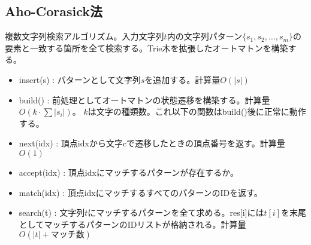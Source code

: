 \subsection{Aho-Corasick法}

複数文字列検索アルゴリズム。入力文字列$t$内の文字列パターン$\{s_1, s_2, \ldots, s_m \}$の要素と一致する箇所を全て検索する。Trie木を拡張したオートマトンを構築する。

\begin{itemize}
    \item insert(s) : パターンとして文字列$s$を追加する。計算量$O(|s|)$
    \item build() : 前処理としてオートマトンの状態遷移を構築する。計算量$O(k\cdot\sum{|s_i|})$。 $k$は文字の種類数。これ以下の関数はbuild()後に正常に動作する。
    \item next(idx) : 頂点idxから文字cで遷移したときの頂点番号を返す。計算量$O(1)$
    \item accept(idx) : 頂点idxにマッチするパターンが存在するか。
    \item match(idx) :  頂点idxにマッチするすべてのパターンのIDを返す。
    \item search(t) : 文字列$t$にマッチするパターンを全て求める。{\ttfamily res[i]}には$t[i]$を末尾としてマッチするパターンのIDリストが格納される。計算量$O(|t|+マッチ数)$
\end{itemize}


